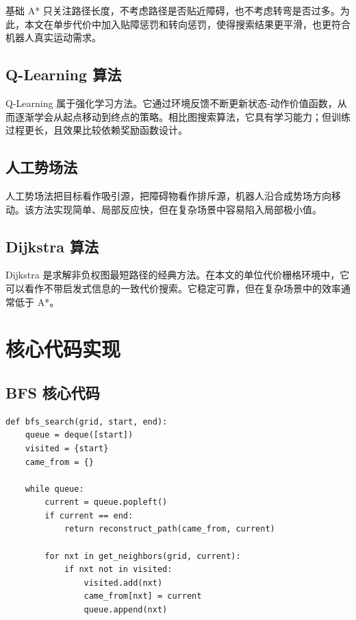 \documentclass[12pt,a4paper,fontset=none]{ctexart}
\begin{document}
基础 A* 只关注路径长度，不考虑路径是否贴近障碍，也不考虑转弯是否过多。为此，本文在单步代价中加入贴障惩罚和转向惩罚，使得搜索结果更平滑，也更符合机器人真实运动需求。

\subsection{Q-Learning 算法}

Q-Learning 属于强化学习方法。它通过环境反馈不断更新状态-动作价值函数，从而逐渐学会从起点移动到终点的策略。相比图搜索算法，它具有学习能力；但训练过程更长，且效果比较依赖奖励函数设计。

\subsection{人工势场法}

人工势场法把目标看作吸引源，把障碍物看作排斥源，机器人沿合成势场方向移动。该方法实现简单、局部反应快，但在复杂场景中容易陷入局部极小值。

\subsection{Dijkstra 算法}

Dijkstra 是求解非负权图最短路径的经典方法。在本文的单位代价栅格环境中，它可以看作不带启发式信息的一致代价搜索。它稳定可靠，但在复杂场景中的效率通常低于 A*。

\section{核心代码实现}

\subsection{BFS 核心代码}

\begin{lstlisting}[caption={BFS 的核心实现}]
def bfs_search(grid, start, end):
    queue = deque([start])
    visited = {start}
    came_from = {}

    while queue:
        current = queue.popleft()
        if current == end:
            return reconstruct_path(came_from, current)

        for nxt in get_neighbors(grid, current):
            if nxt not in visited:
                visited.add(nxt)
                came_from[nxt] = current
                queue.append(nxt)
\end{lstlisting}
\end{document}
